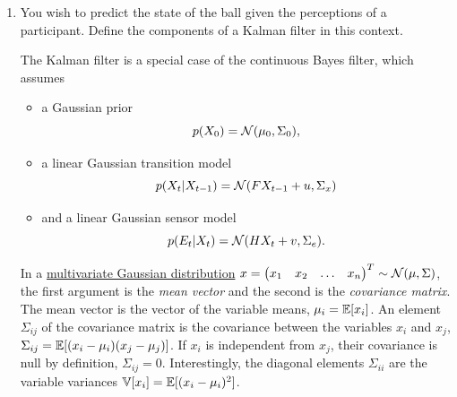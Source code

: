 \documentclass[11pt, a4paper]{article}
\begin{document}
\begin{enumerate}
    \item You wish to predict the state of the ball given the perceptions of a participant. Define the components of a Kalman filter in this context.

    \begin{solution}
        The Kalman filter is a special case of the continuous Bayes filter, which assumes
        \begin{itemize}
            \item a Gaussian prior
            \begin{equation*}
                p(X_0) = \mathcal{N}(\mu_0, \Sigma_0),
            \end{equation*}
            \item a linear Gaussian transition model
            \begin{equation*}
                p(X_t \vert X_{t - 1}) = \mathcal{N}(F X_{t - 1} + u, \Sigma_x)
            \end{equation*}
            \item and a linear Gaussian sensor model
            \begin{equation*}
                p(E_t \vert X_t) = \mathcal{N}(H X_t + v, \Sigma_e).
            \end{equation*}
        \end{itemize}
        In a \href{https://en.wikipedia.org/wiki/Multivariate_normal_distribution}{multivariate Gaussian distribution} $x = \begin{pmatrix}x_1 & x_2 & \dots & x_n\end{pmatrix}^T \sim \mathcal{N}(\mu, \Sigma)$, the first argument is the \emph{mean vector} and the second is the \emph{covariance matrix}. The mean vector is the vector of the variable means, \ie{} $\mu_i = \mathbb{E}[x_i]$. An element $\Sigma_{ij}$ of the covariance matrix is the covariance between the variables $x_i$ and $x_j$, \ie{} $\Sigma_{ij} = \mathbb{E}[(x_i - \mu_i) (x_j - \mu_j)]$. If $x_i$ is independent from $x_j$, their covariance is null by definition, \ie{} $\Sigma_{ij} = 0$. Interestingly, the diagonal elements $\Sigma_{ii}$ are the variable variances $\mathbb{V}[x_i] = \mathbb{E}[(x_i - \mu_i)^2]$.


\end{solution}
\end{enumerate}
\end{document}
